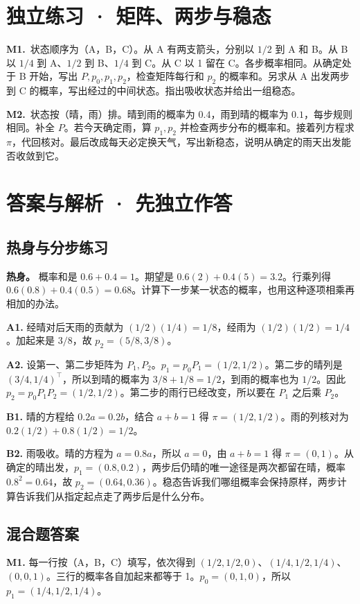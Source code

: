 \documentclass[UTF8,a4paper,11pt]{ctexart}
\newcommand{\PracticeQuestion}[3]{\par\Needspace{4\baselineskip}\noindent\begin{minipage}{\linewidth}\textbf{#1.}\ #2\par\noindent\rule{0pt}{#3mm}\par\end{minipage}\par}
\begin{document}
\section{独立练习 · 矩阵、两步与稳态}
\PracticeQuestion{M1}{状态顺序为（A，B，C）。从 A 有两支箭头，分别以 $1/2$ 到 A 和 B。从 B 以 $1/4$ 到 A、$1/2$ 到 B、$1/4$ 到 C。从 C 以 1 留在 C。各步概率相同。从确定处于 B 开始，写出 $P,p_0,p_1,p_2$，检查矩阵每行和 $p_2$ 的概率和。另求从 A 出发两步到 C 的概率，写出经过的中间状态。指出吸收状态并给出一组稳态。}{40}
\PracticeQuestion{M2}{状态按（晴，雨）排。晴到雨的概率为 $0.4$，雨到晴的概率为 $0.1$，每步规则相同。补全 $P$。若今天确定雨，算 $p_1,p_2$ 并检查两步分布的概率和。接着列方程求 $\pi$，代回核对。最后改成每天必定换天气，写出新稳态，说明从确定的雨天出发能否收敛到它。}{34}
\clearpage
\section{答案与解析 · 先独立作答}
\subsection{热身与分步练习}
\textbf{热身。} 概率和是 $0.6+0.4=1$。期望是 $0.6(2)+0.4(5)=3.2$。行乘列得 $0.6(0.8)+0.4(0.5)=0.68$。计算下一步某一状态的概率，也用这种逐项相乘再相加的办法。

\textbf{A1.} 经晴对后天雨的贡献为 $(1/2)(1/4)=1/8$，经雨为 $(1/2)(1/2)=1/4$。加起来是 $3/8$，故 $p_2=(5/8,3/8)$。

\textbf{A2.} 设第一、第二步矩阵为 $P_1,P_2$。$p_1=p_0P_1=(1/2,1/2)$。第二步的晴列是 $(3/4,1/4)^\top$，所以到晴的概率为 $3/8+1/8=1/2$，到雨的概率也为 $1/2$。因此 $p_2=p_0P_1P_2=(1/2,1/2)$。第二步的雨行已经改变，所以要在 $P_1$ 之后乘 $P_2$。

\textbf{B1.} 晴的方程给 $0.2a=0.2b$，结合 $a+b=1$ 得 $\pi=(1/2,1/2)$。雨的列核对为 $0.2(1/2)+0.8(1/2)=1/2$。

\textbf{B2.} 雨吸收。晴的方程为 $a=0.8a$，所以 $a=0$，由 $a+b=1$ 得 $\pi=(0,1)$。从确定的晴出发，$p_1=(0.8,0.2)$，两步后仍晴的唯一途径是两次都留在晴，概率 $0.8^2=0.64$，故 $p_2=(0.64,0.36)$。稳态告诉我们哪组概率会保持原样，两步计算告诉我们从指定起点走了两步后是什么分布。

\clearpage
\subsection{混合题答案}
\textbf{M1.} 每一行按（A，B，C）填写，依次得到 $(1/2,1/2,0)$、$(1/4,1/2,1/4)$、$(0,0,1)$。三行的概率各自加起来都等于 1。$p_0=(0,1,0)$，所以 $p_1=(1/4,1/2,1/4)$。
\end{document}
